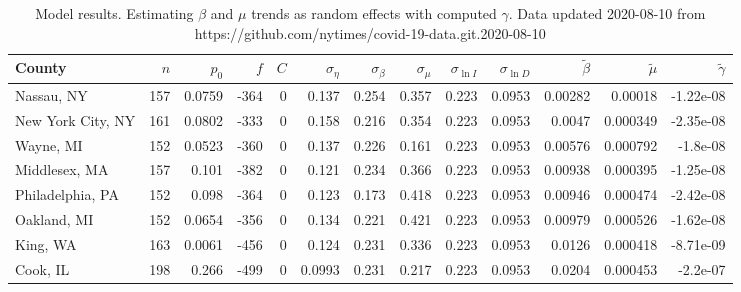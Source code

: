 \documentclass[12pt,letterpaper]{article}
\begin{document}
\begin{sidewaystable}
\caption{
Model results. Estimating $\beta$ and $\mu$ trends as random effects with computed $\gamma$.
Data updated 2020-08-10 from https://github.com/nytimes/covid-19-data.git.2020-08-10
}
\centering
{\small


\begin{tabular}{lrrrrrrrrrrrr}
\hline
 County             &   $n$ &   $p_0$ &    $f$ &   $C$ &   $\sigma_\eta$ &   $\sigma_\beta$ &   $\sigma_\mu$ &   $\sigma_{\ln I}$ &   $\sigma_{\ln D}$ &   $\tilde{\beta}$ &   $\tilde{\mu}$ &   $\tilde\gamma$ \\
\hline
 Nassau, NY         & 157   & 0.0759  & -364   &     0 &          0.137  &           0.254  &         0.357  &              0.223 &             0.0953 &           0.00282 &        0.00018  &       -1.22e-08  \\
 New York City, NY  & 161   & 0.0802  & -333   &     0 &          0.158  &           0.216  &         0.354  &              0.223 &             0.0953 &           0.0047  &        0.000349 &       -2.35e-08  \\
 Wayne, MI          & 152   & 0.0523  & -360   &     0 &          0.137  &           0.226  &         0.161  &              0.223 &             0.0953 &           0.00576 &        0.000792 &       -1.8e-08   \\
 Middlesex, MA      & 157   & 0.101   & -382   &     0 &          0.121  &           0.234  &         0.366  &              0.223 &             0.0953 &           0.00938 &        0.000395 &       -1.25e-08  \\
 Philadelphia, PA   & 152   & 0.098   & -364   &     0 &          0.123  &           0.173  &         0.418  &              0.223 &             0.0953 &           0.00946 &        0.000474 &       -2.42e-08  \\
 Oakland, MI        & 152   & 0.0654  & -356   &     0 &          0.134  &           0.221  &         0.421  &              0.223 &             0.0953 &           0.00979 &        0.000526 &       -1.62e-08  \\
 King, WA           & 163   & 0.0061  & -456   &     0 &          0.124  &           0.231  &         0.336  &              0.223 &             0.0953 &           0.0126  &        0.000418 &       -8.71e-09  \\
 Cook, IL           & 198   & 0.266   & -499   &     0 &          0.0993 &           0.231  &         0.217  &              0.223 &             0.0953 &           0.0204  &        0.000453 &       -2.2e-07   \\

\end{tabular}}
\end{sidewaystable}
\end{document}
